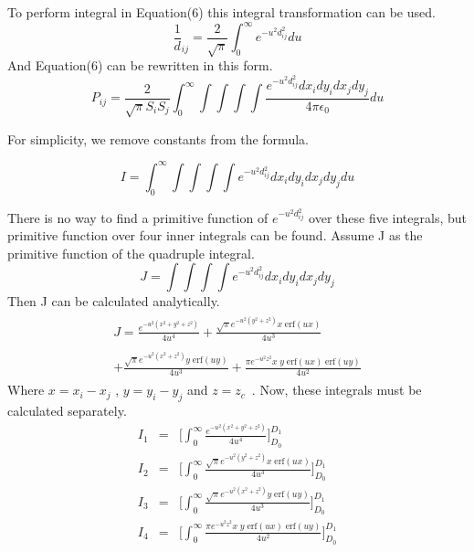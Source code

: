 \documentclass[final,5p,times,twocolumn]{elsarticle}
\begin{document}
To perform integral in Equation(6) this integral transformation can be used\cite{Ciftja2010}.
\begin{equation}\label {eq8}
\frac 1 d_{ij} = \frac{2}{\sqrt{\pi}}\int_0^{\infty} e^{-u^2 d_{ij}^2 }du
\end{equation}
And Equation(6) can be rewritten in this form.
\begin{equation}
\label {eq9}
P_{ij} = \frac 2 {\sqrt{\pi} S_i S_j}\int_0^{\infty}\int \int \int \int \frac{e^{-u^2 d_{ij}^2 } dx_i dy_i dx_j dy_j}{4 \pi \epsilon_0 } du
\end{equation}

For simplicity, we remove constants from the formula.

\begin{equation}
\label {eq10}
I = \int_0^{\infty}\int \int \int \int e^{-u^2 d_{ij}^2} dx_i dy_i dx_j dy_j du
\end{equation}

There is no way to find a primitive function of $e^{-u^2 d_{ij}^2}$ over these five integrals, but primitive function over four inner integrals can be found. Assume J as the primitive function of the quadruple integral.
\begin{equation}
\label {eq11}
J = \int \int \int \int e^{-u^2 d_{ij}^2 } dx_i dy_i dx_j dy_j  
\end{equation}
Then J can be calculated analytically.
\begin{eqnarray}\label {eq12}
\begin{array}{lll}

J = \frac{e^{-u^2(x^2+y^2+z^2)}}{4u^4}+\frac{\sqrt{\pi}e^{-u^2(y^2 + z^2)}x\; \mathrm{erf}(u x)}{4u^3}\\ \\
+\frac{\sqrt{\pi}e^{-u^2(x^2 + z^2)}y\; \mathrm {erf}(u y)}{4u^3}+\frac{\pi e^{-u^2 z^2}x\;y\; \mathrm{erf}(u x)\; \mathrm{erf}(u y)}{4u^2}
\end{array}
\end{eqnarray}
Where $x = x_i - x_j$ , $y = y_i - y_j$ and $z = z_c$\ . 
Now, these integrals must be calculated separately.
\begin{equation}\label {eq13}
\begin{array}{lll}

I_1& = &\big[\int_0^{\infty}\frac{e^{-u^2(x^2+y^2+z^2)}}{4u^4}\big]_{D_0}^{D_1}\\
I_2& = &\big[\int_0^{\infty}\frac{\sqrt{\pi}e^{-u^2(y^2 + z^2)}x\; \mathrm{erf}(u x)}{4u^3}\big]_{D_0}^{D_1}\\ 
I_3& = &\big[\int_0^{\infty}\frac{\sqrt{\pi}e^{-u^2(x^2 + z^2)}y\; \mathrm {erf}(u y)}{4u^3}\big]_{D_0}^{D_1}\\
I_4& = &\big[\int_0^{\infty}\frac{\pi e^{-u^2 z^2}x\;y\; \mathrm{erf}(u x)\; \mathrm{erf}(u y)}{4u^2}\big]_{D_0}^{D_1}
\end{array}
\end{equation}
\end{document}
